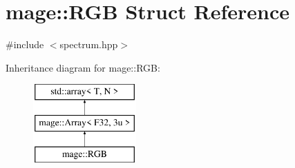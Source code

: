 \hypertarget{structmage_1_1_r_g_b}{}\section{mage\+:\+:R\+GB Struct Reference}
\label{structmage_1_1_r_g_b}


{\ttfamily \#include $<$spectrum.\+hpp$>$}

Inheritance diagram for mage\+:\+:R\+GB\+:\begin{figure}[H]
\begin{center}
\leavevmode
\includegraphics[height=3.000000cm]{structmage_1_1_r_g_b}
\end{center}
\end{figure}
